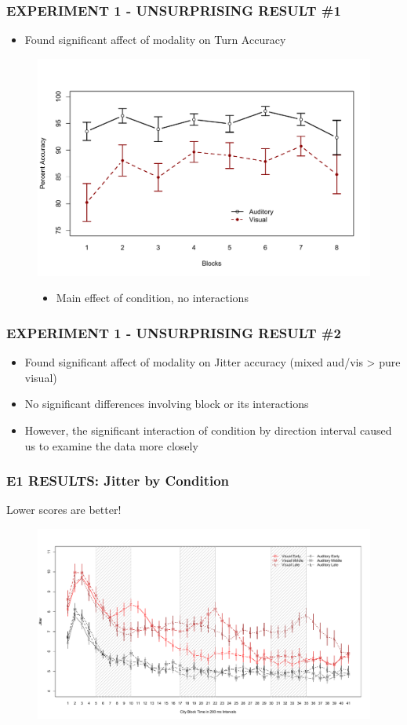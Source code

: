 \documentclass{beamer}
\begin{document}
\begin{frame}
	\frametitle{EXPERIMENT 1 - UNSURPRISING RESULT \#1}
	\begin{itemize}
		\item Found significant affect of modality on Turn Accuracy
	\end{itemize}
	\begin{figure}
		\centering
		\includegraphics[width=.8\textwidth]{../zNvBkFigs/Rplot_E1_acc_CondByBlks}
		\begin{itemize}
			\item Main effect of condition, no interactions
		\end{itemize}
	\end{figure}
\end{frame}

\begin{frame}
	\frametitle{EXPERIMENT 1 - UNSURPRISING RESULT \#2}
	\begin{itemize}
		\item Found significant affect of modality on Jitter accuracy (mixed aud/vis > pure visual)
		\item No significant differences involving block or its interactions
		\pause
		\item However, the significant interaction of condition by direction interval caused us to examine the data more closely
	\end{itemize}
\end{frame}

\begin{frame} 
	\frametitle{E1 RESULTS: Jitter by Condition}
	Lower scores are better!
	\begin{figure}
		\centering
		\includegraphics[width=.9\textwidth]{../zNvBkFigs/Rplot-e1jit41-best-110730}
	\end{figure}
\end{frame}
\end{document}
